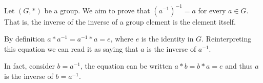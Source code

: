 \documentclass[12pt]{article}
\begin{document}
Let $(G,*)$ be a group.
We aim to prove that  ${(a^{-1})}^{-1}=a$ for every $a\in G$.
That is, the inverse of the inverse of a group element is the element itself.

By definition $a*a^{-1}=a^{-1}*a=e$, where $e$ is the identity in $G$. Reinterpreting this equation we can read it as saying that $a$ is the inverse of $a^{-1}$.

In fact, consider $b=a^{-1}$, the equation can be written $a*b=b*a=e$ and thus $a$ is the inverse of $b=a^{-1}$.

\end{document}
